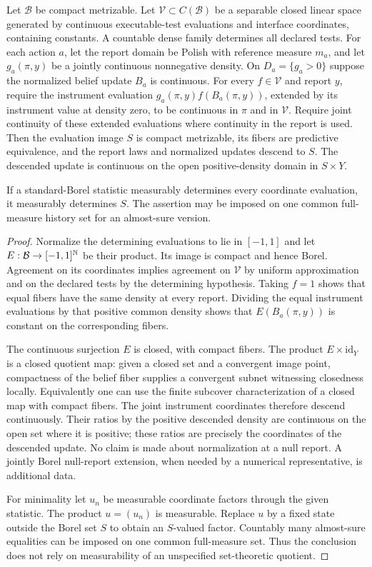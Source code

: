 \begin{proposition}\label{prop:quotient}
Let $\mathcal B$ be compact metrizable. Let $\mathcal V\subset C(\mathcal B)$ be a separable closed linear space generated by continuous executable-test evaluations and interface coordinates, containing constants. A countable dense family determines all declared tests. For each action $a$, let the report domain be Polish with reference measure $m_a$, and let $g_a(\pi,y)$ be a jointly continuous nonnegative density. On $D_a=\{g_a>0\}$ suppose the normalized belief update $B_a$ is continuous. For every $f\in\mathcal V$ and report $y$, require the instrument evaluation $g_a(\pi,y)f(B_a(\pi,y))$, extended by its instrument value at density zero, to be continuous in $\pi$ and in $\mathcal V$. Require joint continuity of these extended evaluations where continuity in the report is used. Then the evaluation image $S$ is compact metrizable, its fibers are predictive equivalence, and the report laws and normalized updates descend to $S$. The descended update is continuous on the open positive-density domain in $S\times Y$.

If a standard-Borel statistic measurably determines every coordinate evaluation, it measurably determines $S$. The assertion may be imposed on one common full-measure history set for an almost-sure version.
\end{proposition}
\begin{proof}
Normalize the determining evaluations to lie in $[-1,1]$ and let $E:\mathcal B\to[-1,1]^{\mathbb N}$ be their product. Its image is compact and hence Borel. Agreement on its coordinates implies agreement on $\mathcal V$ by uniform approximation and on the declared tests by the determining hypothesis. Taking $f=1$ shows that equal fibers have the same density at every report. Dividing the equal instrument evaluations by that positive common density shows that $E(B_a(\pi,y))$ is constant on the corresponding fibers.

The continuous surjection $E$ is closed, with compact fibers. The product $E\times\mathrm{id}_Y$ is a closed quotient map: given a closed set and a convergent image point, compactness of the belief fiber supplies a convergent subnet witnessing closedness locally. Equivalently one can use the finite subcover characterization of a closed map with compact fibers. The joint instrument coordinates therefore descend continuously. Their ratios by the positive descended density are continuous on the open set where it is positive; these ratios are precisely the coordinates of the descended update. No claim is made about normalization at a null report. A jointly Borel null-report extension, when needed by a numerical representative, is additional data.

For minimality let $u_n$ be measurable coordinate factors through the given statistic. The product $u=(u_n)$ is measurable. Replace $u$ by a fixed state outside the Borel set $S$ to obtain an $S$-valued factor. Countably many almost-sure equalities can be imposed on one common full-measure set. Thus the conclusion does not rely on measurability of an unspecified set-theoretic quotient.
\end{proof}

